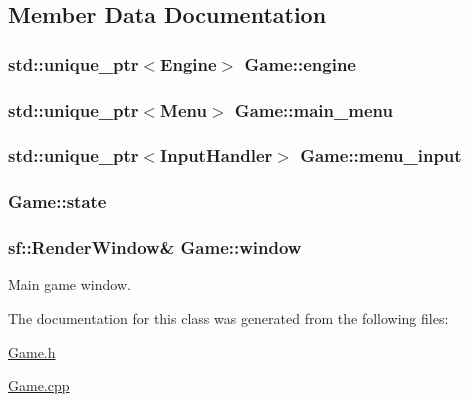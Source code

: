 \subsection{Member Data Documentation}
\hypertarget{class_game_aee6b9ebe224001f736e1ed71a3b28223}{}
\subsubsection[{engine}]{\setlength{\rightskip}{0pt plus 5cm}std\+::unique\+\_\+ptr$<${\bf Engine}$>$ Game\+::engine}\label{class_game_aee6b9ebe224001f736e1ed71a3b28223}
\hypertarget{class_game_ae08cf171b4f973d47def68d69f561e2c}{}
\subsubsection[{main\+\_\+menu}]{\setlength{\rightskip}{0pt plus 5cm}std\+::unique\+\_\+ptr$<${\bf Menu}$>$ Game\+::main\+\_\+menu}\label{class_game_ae08cf171b4f973d47def68d69f561e2c}
\hypertarget{class_game_a82776f65732ac43cf35b8b7c7120c873}{}
\subsubsection[{menu\+\_\+input}]{\setlength{\rightskip}{0pt plus 5cm}std\+::unique\+\_\+ptr$<${\bf Input\+Handler}$>$ Game\+::menu\+\_\+input\hspace{0.3cm}{\ttfamily [private]}}\label{class_game_a82776f65732ac43cf35b8b7c7120c873}
\hypertarget{class_game_ad9fc2a8710ee56916f79314b91112ed0}{}
\subsubsection[{state}]{ Game\+::state\hspace{0.3cm}{\ttfamily [private]}}\label{class_game_ad9fc2a8710ee56916f79314b91112ed0}
\hypertarget{class_game_ad0fb4d8653dcf289fd6573cf5ba0f3d1}{}
\subsubsection[{window}]{\setlength{\rightskip}{0pt plus 5cm}sf\+::\+Render\+Window\& Game\+::window\hspace{0.3cm}{\ttfamily [private]}}\label{class_game_ad0fb4d8653dcf289fd6573cf5ba0f3d1}


Main game window. 



The documentation for this class was generated from the following files\+:\begin{DoxyCompactItemize}
\item 
\hyperlink{_game_8h}{Game.\+h}\item 
\hyperlink{_game_8cpp}{Game.\+cpp}\end{DoxyCompactItemize}
